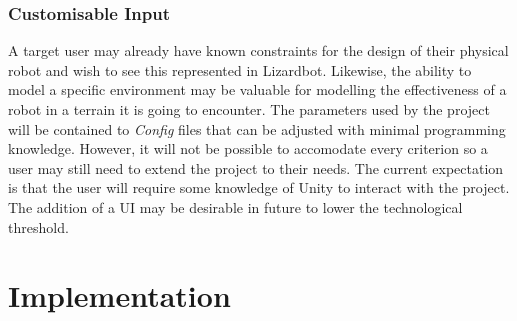 \documentclass{article}
\begin{document}
\subsubsection{Customisable Input}
\label{sec:Customisable Input}
A target user may already have known constraints for the design of their physical robot and wish to see this represented in Lizardbot. Likewise, the ability to model a specific environment may be valuable for modelling the effectiveness of a robot in a terrain it is going to encounter.
The parameters used by the project will be contained to \textit{Config} files that can be adjusted with minimal programming knowledge. However, it will not be possible to accomodate every criterion so a user may still need to extend the project to their needs. 
The current expectation is that the user will require some knowledge of Unity to interact with the project. The addition of a UI may be desirable in future to lower the technological threshold. 



\newpage
\section{Implementation}
\label{sec:Implementation}
\end{document}
